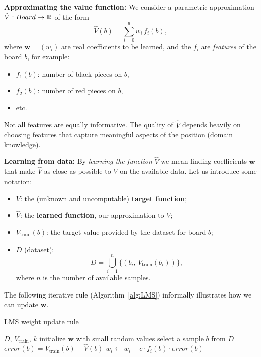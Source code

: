 \documentclass[10pt, letterpaper]{report}
\begin{document}
\bigskip
\textbf{Approximating the value function:}
We consider a parametric approximation $\hat V: Board\rightarrow{\mathbb R}$ of the form
\begin{equation}
	\hat V(b)=\sum_{i=0}^6 w_i\, f_i(b),
\end{equation}
where $\mathbf w=(w_i)$ are real coefficients to be learned, and the $f_i$ are \emph{features} of the board $b$, for example:
\begin{itemize}
	\item $f_1(b)$: number of black pieces on $b$,
	\item $f_2(b)$: number of red pieces on $b$,
	\item etc.
\end{itemize}
Not all features are equally informative. The quality of $\hat V$ depends heavily on choosing features that capture meaningful aspects of the position (domain knowledge).

\bigskip
\textbf{Learning from data:}
By \emph{learning the function} $\hat V$ we mean finding coefficients $\mathbf w$ that make $\hat V$ as close as possible to $V$ on the available data. Let us introduce some notation:
\begin{itemize}
	\item $V$: the (unknown and uncomputable) \textbf{target function};
	\item $\hat V$: the \textbf{learned function}, our approximation to $V$;
	\item $V_{\text{train}}(b)$: the target value provided by the dataset for board $b$;
	\item $D$ (dataset):
	      \begin{equation}
		      D=\bigcup_{i=1}^n\{(b_i,\, V_{\text{train}}(b_i))\},
	      \end{equation}
	      where $n$ is the number of available samples.
\end{itemize}

The following iterative rule (Algorithm~\ref{alg:LMS}) informally illustrates how we can update $\mathbf w$.

\begin{algorithm}
	\caption{LMS weight update rule}\label{alg:LMS}
	\begin{algorithmic}
		\Require $D$, $V_{\text{train}}$, $k$
		\State initialize $\mathbf w$ with small random values
		\State select a sample $b$ from $D$
		\State $error(b)=V_{\text{train}}(b)-\hat V(b)$
		\State $w_i\leftarrow w_i + c \cdot f_i(b) \cdot error(b)$
		\EndFor
		\EndFor
	\end{algorithmic}
\end{algorithm}
\end{document}
